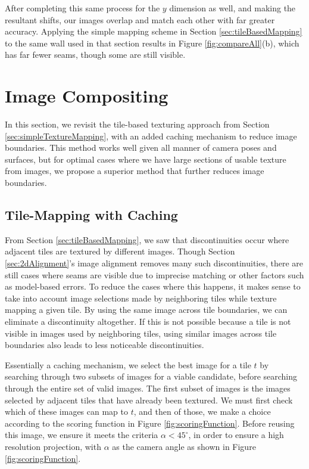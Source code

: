 \documentclass[]{spie}  %
\begin{document}
After completing this same process for the $y$ dimension as well, and
making the resultant shifts, our images overlap and match each other
with far greater accuracy. Applying the simple mapping scheme in
Section \ref{sec:tileBasedMapping} to the same wall used in that section results in Figure \ref{fig:compareAll}(b), which has far
fewer seams, though some are still visible.

\section{Image Compositing}
\label{sec:imageCompositing}
In this section, we revisit the tile-based texturing approach from
Section \ref{sec:simpleTextureMapping}, with an added caching
mechanism to reduce image boundaries. This method works well given all
manner of camera poses and surfaces, but for optimal cases where we
have large sections of usable texture from images, we propose a
superior method that further reduces image boundaries.

\subsection{Tile-Mapping with Caching}
\label{sec:mappingWithCaching}
From Section \ref{sec:tileBasedMapping}, we saw that discontinuities
occur where adjacent tiles are textured by different images. Though
Section \ref{sec:2dAlignment}'s image alignment removes many such
discontinuities, there are still cases where seams are visible due to
imprecise matching or other factors such as model-based errors. To
reduce the cases where this happens, it makes sense to take into
account image selections made by neighboring tiles while texture
mapping a given tile. By using the same image across tile boundaries,
we can eliminate a discontinuity altogether. If this is not possible
because a tile is not visible in images used by neighboring tiles,
using similar images across tile boundaries also leads to less
noticeable discontinuities.

Essentially a caching mechanism, we select the best image for a tile
$t$ by searching through two subsets of images for a viable candidate,
before searching through the entire set of valid images. The first
subset of images is the images selected by adjacent tiles that have
already been textured. We must first check which of these images can
map to $t$, and then of those, we make a choice according to the
scoring function in Figure \ref{fig:scoringFunction}. Before reusing
this image, we ensure it meets the criteria $\alpha < 45^\circ$, in
order to ensure a high resolution projection, with $\alpha$ as the
camera angle as shown in Figure \ref{fig:scoringFunction}.
\end{document}
